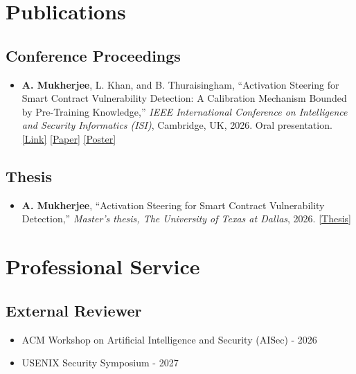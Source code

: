 \documentclass[11pt,letterpaper]{article}
\begin{document}
\section*{Publications}
\subsection*{Conference Proceedings}
\begin{itemize}
    \item \textbf{A. Mukherjee}, L. Khan, and B. Thuraisingham, ``Activation Steering for Smart Contract Vulnerability Detection: A Calibration Mechanism Bounded by Pre-Training Knowledge,'' \textit{IEEE International Conference on Intelligence and Security Informatics (ISI)}, Cambridge, UK, 2026. Oral presentation. \href{https://ieeexplore.ieee.org/document/11685839}{[Link]} \href{https://themukherjee.com/assets/pdf/activation-steering-isi-2026-accepted-version.pdf}{[Paper]} \href{https://themukherjee.com/assets/pdf/isi_paper_poster_portrait_CCC.pdf}{[Poster]}
\end{itemize}
\subsection*{Thesis}
\begin{itemize}
    \item \textbf{A. Mukherjee}, ``Activation Steering for Smart Contract Vulnerability Detection,'' \textit{Master's thesis, The University of Texas at Dallas}, 2026. \href{https://www.proquest.com/docview/3354974136}{[Thesis]}
\end{itemize}

\section*{Professional Service}
\subsection*{External Reviewer}
\begin{itemize}
    \item ACM Workshop on Artificial Intelligence and Security (AISec) - 2026
    \item USENIX Security Symposium - 2027
\end{itemize}
\end{document}
